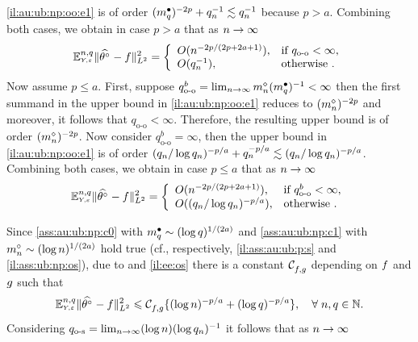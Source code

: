\begin{il}
\begin{Liste}[]
\eqref{il:au:ub:np:oo:e1} is of order $(\sDi{\ssE})^{-2p}+\ssE_{\ssY}^{-1}\lesssim\ssE_{\ssY}^{-1}$ because $p>a$. Combining both
  cases, we obtain in case $p>a$ that as
 $\ssY\to\infty$
\begin{equation*}
\FuEx[\ssY,\ssE]{\rY,\rE}\VnormLp{\hxdf-\xdf}^2=\left\{\begin{array}{ll}
O(\ssY^{-2p/(2p+2a+1)}),& \text{if }q_{\text{o-o}}<\infty,\\
O(\ssE_{\ssY}^{-1}),& \text{otherwise }.
\end{array}\right.
\end{equation*}
Now assume $p\leq a$. First, suppose 
$q^b_{\text{o-o}}=\lim_{\ssY\to\infty}\aDi{\ssY}(\sDi{\ssE})^{-1}<\infty$
then the first summand in the upper bound in \eqref{il:au:ub:np:oo:e1}
reduces to $(\aDi{\ssY})^{-2p}$ and moreover, it follows that
$q_{\text{o-o}}<\infty$. Therefore, the resulting upper bound
is of order $(\aDi{\ssY})^{-2p}$. Now consider
$q^b_{\text{o-o}}=\infty$, then   the upper bound in
\eqref{il:au:ub:np:oo:e1} is of order $(\ssE_{\ssY}/\log\ssE_{\ssY})^{-p/a}+\ssE_{\ssY}^{-p/a}\lesssim(\ssE_{\ssY}/\log\ssE_{\ssY})^{-p/a}$. Combining both
  cases, we obtain in case $p\leq a$ that as
 $\ssY\to\infty$
\begin{equation*}
\FuEx[\ssY,\ssE]{\rY,\rE}\VnormLp{\hxdf-\xdf}^2=\left\{\begin{array}{ll}
O(\ssY^{-2p/(2p+2a+1)}),& \text{if }q^b_{\text{o-o}}<\infty,\\
O((\ssE_{\ssY}/\log\ssE_{\ssY})^{-p/a}),& \text{otherwise }.
\end{array}\right.
\end{equation*}
 \item[\mylabel{il:au:ub:np:os}{\dg\bfseries{[o-s]}}]
Since  \ref{ass:au:ub:np:c0} with $\sDi{\ssE}\sim
(\log\ssE)^{1/(2a)}$ and \ref{ass:au:ub:np:c1} with
$\oDi{\ssY}\sim (\log\ssY)^{1/(2a)}$ hold true
(cf., respectively,  \ref{il:ass:au:ub:p:s} and
 \ref{il:ass:ub:np:os}), due to
 and  \ref{il:ee:os}
there is a constant $\cst{\xdf,\edf}$ depending on $\xdf$ and $\edf$
such that
\begin{equation}\label{il:au:ub:np:os:e2}\FuEx[\ssY,\ssE]{\rY,\rE}\VnormLp{\hxdf-\xdf}^2\leq\cst{\xdf,\edf}\{(\log\ssY)^{-p/a}+(\log\ssE)^{-p/a}\},\quad\forall\;\ssY,\ssE\in\Nz.\end{equation} 
Considering $q_{\text{o-s}}=\lim_{\ssY\to\infty}(\log \ssY)(\log \ssE_{\ssY})^{-1}$  it follows that as
 $\ssY\to\infty$
\begin{equation*}

\end{equation*}
\end{Liste}
\end{il}
